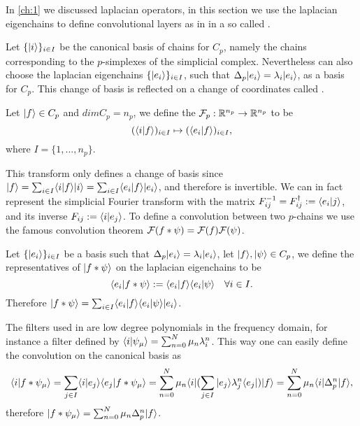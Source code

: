 \documentclass[../3.tex]{subfiles}
\begin{document}
    In \autoref{ch:1} we discussed laplacian operators, in this section we use the laplacian 
    eigenchains to define convolutional layers as in \cite{simplicialNN} in a so called . 

    Let $\{| i \rangle\}_{i \in I}$ be the canonical basis of chains for $C_p$, namely the chains corresponding to the $p$-simplexes of the simplicial complex.
    Nevertheless can also choose the laplacian eigenchains $\{| e_i \rangle\}_{i \in I}$, such that $\Delta_p| e_i \rangle = \lambda_i| e_i \rangle$, as a basis for $C_p$. This change of basis
    is reflected on a change of coordinates called .

    \begin{defn}
        Let $| f \rangle \in C_p$ and $dimC_p = n_p$, we define the  $\mathcal{F}_p : \mathbb{R}^{n_p} \to \mathbb{R}^{n_p}$ to be
        \[ (\langle i | f \rangle)_{i \in I} \mapsto (\langle e_i | f \rangle)_{i \in I},\]
        where $I = \{1,...,n_p\}$.
    \end{defn}

    This transform only defines a change of basis since $| f \rangle = \sum_{i \in I}\langle i | f \rangle| i \rangle = \sum_{i \in I}\langle e_i | f \rangle| e_i \rangle$, and therefore is invertible.
    We can in fact represent the simplicial Fourier transform with the matrix $F^{-1}_{ij} = F^\dagger_{ij} := \langle e_i | j \rangle$, and its inverse $F_{ij} := \langle i | e_j \rangle$.
    To define a convolution between two $p$-chains we use the famous convolution theorem $\mathcal{F}(f * \psi) = \mathcal{F}(f)\mathcal{F}(\psi)$. 

    \begin{defn}
        Let $\{| e_i \rangle\}_{i \in I}$ be a basis such that $\Delta_p| e_i \rangle = \lambda_i| e_i \rangle$, let $| f \rangle,| \psi \rangle \in C_p$, we define the representatives of $| f * \psi \rangle$ on
        the laplacian eigenchains to be 
        \[ \langle e_i | f * \psi \rangle := \langle e_i | f \rangle\langle e_i | \psi \rangle \quad \forall i \in I.\]
        Therefore $| f * \psi \rangle = \sum_{i \in I}\langle e_i | f \rangle\langle e_i | \psi \rangle| e_i \rangle$.
    \end{defn}

    The filters used in \cite{simplicialNN} are low degree polynomials in the frequency domain, for instance a filter defined by $\langle i | \psi_\mu \rangle = \sum_{n = 0}^N \mu_n \lambda_i^n$.
    This way one can easily define the convolution on the canonical basis as 
    \[\langle i | f * \psi_\mu \rangle = \sum_{j \in I}\langle i | e_j \rangle\langle e_j | f*\psi_\mu \rangle = \sum_{n = 0}^N\mu_n \langle i |(\sum_{j \in I}| e_j \rangle\lambda_j^n\langle e_j |)| f \rangle
     = \sum_{n=0}^N \mu_n \langle i |\Delta_p^n| f \rangle,\]
    therefore $| f*\psi_\mu \rangle = \sum_{n = 0}^N \mu_n \Delta_p^n| f \rangle$.
\end{document}

